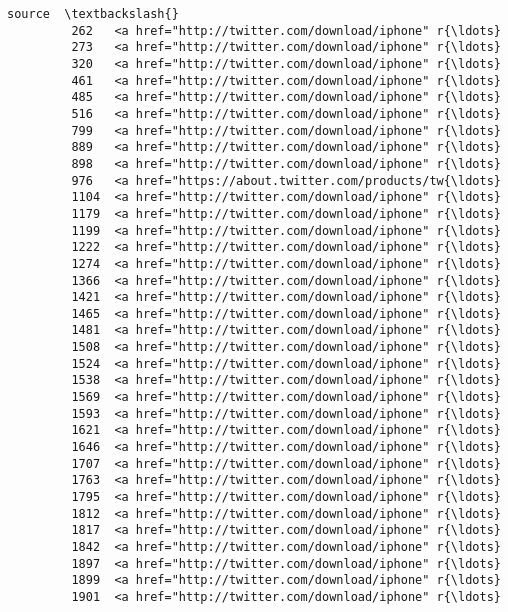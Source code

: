 \documentclass[11pt]{article}
\begin{document}
\begin{Verbatim}[commandchars=\\\{\}]
                                                          source  \textbackslash{}
         262   <a href="http://twitter.com/download/iphone" r{\ldots}   
         273   <a href="http://twitter.com/download/iphone" r{\ldots}   
         320   <a href="http://twitter.com/download/iphone" r{\ldots}   
         461   <a href="http://twitter.com/download/iphone" r{\ldots}   
         485   <a href="http://twitter.com/download/iphone" r{\ldots}   
         516   <a href="http://twitter.com/download/iphone" r{\ldots}   
         799   <a href="http://twitter.com/download/iphone" r{\ldots}   
         889   <a href="http://twitter.com/download/iphone" r{\ldots}   
         898   <a href="http://twitter.com/download/iphone" r{\ldots}   
         976   <a href="https://about.twitter.com/products/tw{\ldots}   
         1104  <a href="http://twitter.com/download/iphone" r{\ldots}   
         1179  <a href="http://twitter.com/download/iphone" r{\ldots}   
         1199  <a href="http://twitter.com/download/iphone" r{\ldots}   
         1222  <a href="http://twitter.com/download/iphone" r{\ldots}   
         1274  <a href="http://twitter.com/download/iphone" r{\ldots}   
         1366  <a href="http://twitter.com/download/iphone" r{\ldots}   
         1421  <a href="http://twitter.com/download/iphone" r{\ldots}   
         1465  <a href="http://twitter.com/download/iphone" r{\ldots}   
         1481  <a href="http://twitter.com/download/iphone" r{\ldots}   
         1508  <a href="http://twitter.com/download/iphone" r{\ldots}   
         1524  <a href="http://twitter.com/download/iphone" r{\ldots}   
         1538  <a href="http://twitter.com/download/iphone" r{\ldots}   
         1569  <a href="http://twitter.com/download/iphone" r{\ldots}   
         1593  <a href="http://twitter.com/download/iphone" r{\ldots}   
         1621  <a href="http://twitter.com/download/iphone" r{\ldots}   
         1646  <a href="http://twitter.com/download/iphone" r{\ldots}   
         1707  <a href="http://twitter.com/download/iphone" r{\ldots}   
         1763  <a href="http://twitter.com/download/iphone" r{\ldots}   
         1795  <a href="http://twitter.com/download/iphone" r{\ldots}   
         1812  <a href="http://twitter.com/download/iphone" r{\ldots}   
         1817  <a href="http://twitter.com/download/iphone" r{\ldots}   
         1842  <a href="http://twitter.com/download/iphone" r{\ldots}   
         1897  <a href="http://twitter.com/download/iphone" r{\ldots}   
         1899  <a href="http://twitter.com/download/iphone" r{\ldots}   
         1901  <a href="http://twitter.com/download/iphone" r{\ldots}   

\end{Verbatim}
\end{document}
